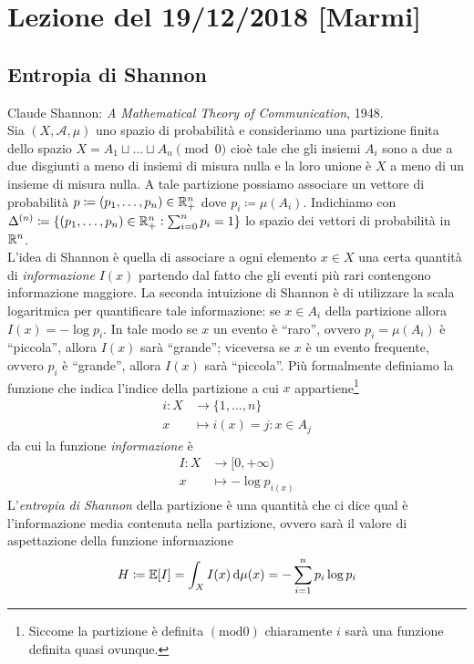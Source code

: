 \section{Lezione del 19/12/2018 [Marmi]}

\subsection{Entropia di Shannon}
Claude Shannon: \emph{A Mathematical Theory of Communication}, 1948. \\

Sia $ (X, \mathcal{A}, \mu) $ uno spazio di probabilità e consideriamo una partizione finita dello spazio \linebreak $ X = A_1 \sqcup \ldots \sqcup A_n \pmod{0} $ cioè tale che gli insiemi $ A_i $ sono a due a due disgiunti a meno di insiemi di misura nulla e la loro unione è $ X $ a meno di un insieme di misura nulla. A tale partizione possiamo associare un vettore di probabilità $ p \coloneqq (p_1, \ldots, p_n) \in \mathbb{R}^n_+ $ dove $ p_i \coloneqq \mu(A_i) $. Indichiamo con $ \Delta^{(n)} \coloneqq \{(p_1, \ldots, p_n) \in \mathbb{R}^n_+ : \sum_{i=0}^{n} p_i=1\} $ lo spazio dei vettori di probabilità in $ \mathbb{R}^n $. \\

L'idea di Shannon è quella di associare a ogni elemento $ x \in X $ una certa quantità di \emph{informazione} $ I(x) $ partendo dal fatto che gli eventi più rari contengono informazione maggiore. La seconda intuizione di Shannon è di utilizzare la scala logaritmica per quantificare tale informazione: se $ x \in A_i $ della partizione allora $ I(x) = -\log p_i $. In tale modo se $ x $ un evento è ``raro'', ovvero $ p_i=\mu(A_i) $ è ``piccola'', allora $ I(x) $ sarà ``grande''; viceversa se $ x $ è un evento frequente, ovvero $ p_i $ è ``grande'', allora $ I(x) $ sarà ``piccola''. Più formalmente definiamo la funzione che indica l'indice della partizione a cui $ x $ appartiene\footnote{Siccome la partizione è definita $ (\mathrm{mod} 0) $ chiaramente $ i $ sarà una funzione definita quasi ovunque.}
\begin{align*}
    i \colon X & \to \{1, \ldots, n\} \\
    x & \mapsto i(x) = j : x \in A_{j}
\end{align*}
da cui la funzione \emph{informazione} è
\begin{align*}
    I \colon X & \to [0, +\infty) \\
    x & \mapsto -\log p_{i(x)}
\end{align*}
L'\emph{entropia di Shannon} della partizione è una quantità che ci dice qual è l'informazione media contenuta nella partizione, ovvero sarà il valore di aspettazione della funzione informazione
\begin{equation} \label{eqn:entropia-shannon}
    H \coloneqq \mathbb{E}[I] = \int_{X} I(x) \dif{\mu(x)} = -\sum_{i=1}^{n} p_i \log{p_i}
\end{equation}


